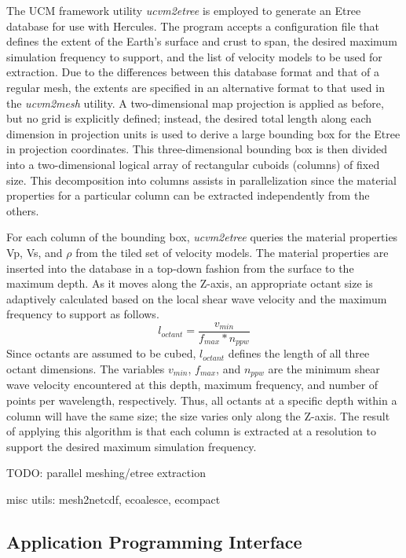 The UCM framework utility \emph{ucvm2etree} is employed to generate an Etree database for use with Hercules. The program accepts a configuration file that defines the extent of the Earth's surface and crust to span, the desired maximum simulation frequency to support, and the list of velocity models to be used for extraction. Due to the differences between this database format and that of a regular mesh, the extents are specified in an alternative format to that used in the \emph{ucvm2mesh} utility. A two-dimensional map projection is applied as before, but no grid is explicitly defined; instead, the desired total length along each dimension in projection units is used to derive a large bounding box for the Etree in projection coordinates. This three-dimensional bounding box is then divided into a two-dimensional logical array of rectangular cuboids (columns) of fixed size. This decomposition into columns assists in parallelization since the material properties for a particular column can be extracted independently from the others.

For each column of the bounding box, \emph{ucvm2etree} queries the material properties Vp, Vs, and $\rho$ from the tiled set of velocity models. The material properties are inserted into the database in a top-down fashion from the surface to the maximum depth. As it moves along the Z-axis, an appropriate octant size is adaptively calculated based on the local shear wave velocity and the maximum frequency to support as follows.
\begin{equation*}
l_{octant} = \frac{v_{min}}{f_{max} * n_{ppw}}
\end{equation*}
Since octants are assumed to be cubed, $l_{octant}$ defines the length of all three octant dimensions. The variables $v_{min}$, $f_{max}$, and $n_{ppw}$ are the minimum shear wave velocity encountered at this depth, maximum frequency, and number of points per wavelength, respectively. Thus, all octants at a specific depth within a column will have the same size; the size varies only along the Z-axis. The result of applying this algorithm is that each column is extracted at a resolution to support the desired maximum simulation frequency.

TODO: parallel meshing/etree extraction

misc utils: mesh2netcdf, ecoalesce, ecompact

\subsection{Application Programming Interface}


